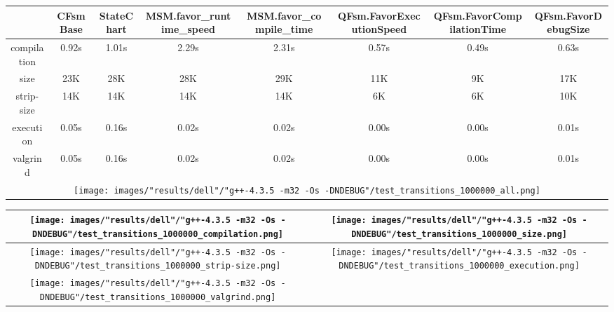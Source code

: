 \begin{landscape}
\begin{table}
\caption{"dell" [df6407d], g++-4.3.5 -m32 -Os -DNDEBUG/test transitions 1000000}
\centering
\begin{longtable}{| c | c |c |c |c |c |c |c |}
\hline
& CFsmBase& StateChart& MSM.favor\_runtime\_speed& MSM.favor\_compile\_time& QFsm.FavorExecutionSpeed& QFsm.FavorCompilationTime& QFsm.FavorDebugSize\\
\hline
compilation & 0.92s & 1.01s & 2.29s & 2.31s & 0.57s & 0.49s & 0.63s\\
\hline
size & 23K & 28K & 28K & 29K & 11K & 9K & 17K\\
\hline
strip-size & 14K & 14K & 14K & 14K & 6K & 6K & 10K\\
\hline
execution & 0.05s & 0.16s & 0.02s & 0.02s & 0.00s & 0.00s & 0.01s\\
\hline
valgrind & 0.05s & 0.16s & 0.02s & 0.02s & 0.00s & 0.00s & 0.01s\\
\hline
\multicolumn{8}{|c|}{\texttt{[image: images/"results/dell"/"g++-4.3.5 -m32 -Os -DNDEBUG"/test\_transitions\_1000000\_all.png]}}\\
\hline
\end{longtable}
\end{table}
\end{landscape}
\newpage
\begin{table}
\centering
\begin{longtable}{| c | c |}
\hline
\texttt{[image: images/"results/dell"/"g++-4.3.5 -m32 -Os -DNDEBUG"/test\_transitions\_1000000\_compilation.png]}& \texttt{[image: images/"results/dell"/"g++-4.3.5 -m32 -Os -DNDEBUG"/test\_transitions\_1000000\_size.png]}\\
\hline
\texttt{[image: images/"results/dell"/"g++-4.3.5 -m32 -Os -DNDEBUG"/test\_transitions\_1000000\_strip-size.png]}& \texttt{[image: images/"results/dell"/"g++-4.3.5 -m32 -Os -DNDEBUG"/test\_transitions\_1000000\_execution.png]}\\
\hline
\texttt{[image: images/"results/dell"/"g++-4.3.5 -m32 -Os -DNDEBUG"/test\_transitions\_1000000\_valgrind.png]}& \\ \hline
\end{longtable}
\end{table}

